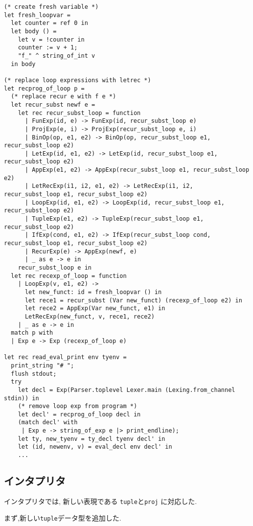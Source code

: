 \begin{lstlisting}[caption=main.ml]
(* create fresh variable *)
let fresh_loopvar = 
  let counter = ref 0 in
  let body () =
    let v = !counter in
    counter := v + 1; 
    "f_" ^ string_of_int v
  in body

(* replace loop expressions with letrec *)
let recprog_of_loop p =
  (* replace recur e with f e *)
  let recur_subst newf e = 
    let rec recur_subst_loop = function
      | FunExp(id, e) -> FunExp(id, recur_subst_loop e) 
      | ProjExp(e, i) -> ProjExp(recur_subst_loop e, i)
      | BinOp(op, e1, e2) -> BinOp(op, recur_subst_loop e1, recur_subst_loop e2)
      | LetExp(id, e1, e2) -> LetExp(id, recur_subst_loop e1, recur_subst_loop e2)
      | AppExp(e1, e2) -> AppExp(recur_subst_loop e1, recur_subst_loop e2)
      | LetRecExp(i1, i2, e1, e2) -> LetRecExp(i1, i2, recur_subst_loop e1, recur_subst_loop e2)
      | LoopExp(id, e1, e2) -> LoopExp(id, recur_subst_loop e1, recur_subst_loop e2)
      | TupleExp(e1, e2) -> TupleExp(recur_subst_loop e1, recur_subst_loop e2)
      | IfExp(cond, e1, e2) -> IfExp(recur_subst_loop cond, recur_subst_loop e1, recur_subst_loop e2)
      | RecurExp(e) -> AppExp(newf, e)
      | _ as e -> e in
    recur_subst_loop e in
  let rec recexp_of_loop = function 
    | LoopExp(v, e1, e2) -> 
      let new_funct: id = fresh_loopvar () in
      let rece1 = recur_subst (Var new_funct) (recexp_of_loop e2) in
      let rece2 = AppExp(Var new_funct, e1) in
      LetRecExp(new_funct, v, rece1, rece2)
    | _ as e -> e in 
  match p with
  | Exp e -> Exp (recexp_of_loop e)

let rec read_eval_print env tyenv =
  print_string "# ";
  flush stdout;
  try
    let decl = Exp(Parser.toplevel Lexer.main (Lexing.from_channel stdin)) in
    (* remove loop exp from program *)
    let decl' = recprog_of_loop decl in
    (match decl' with
     | Exp e -> string_of_exp e |> print_endline);
    let ty, new_tyenv = ty_decl tyenv decl' in
    let (id, newenv, v) = eval_decl env decl' in
    ...
\end{lstlisting}

\subsection*{インタプリタ}

インタプリタでは, 新しい表現である \lstinline{tuple}と\lstinline{proj} に対応した.

まず,新しい\lstinline{tuple}データ型を追加した.

